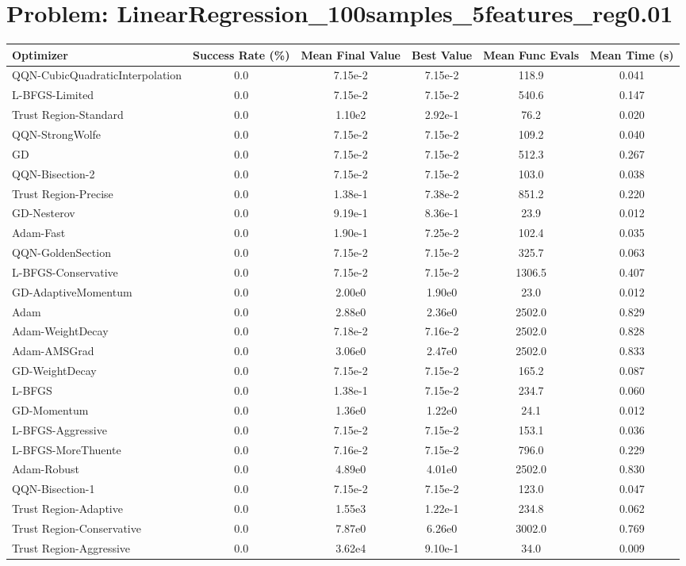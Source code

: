 \documentclass{article}
\begin{document}
\section{Problem: LinearRegression\_100samples\_5features\_reg0.01}
\begin{longtable}{p{3cm}*{5}{c}}
\toprule
\textbf{Optimizer} & \textbf{Success Rate (\%)} & \textbf{Mean Final Value} & \textbf{Best Value} & \textbf{Mean Func Evals} & \textbf{Mean Time (s)} \\
\midrule
QQN-CubicQuadraticInterpolation & 0.0 & 7.15e-2 & 7.15e-2 & 118.9 & 0.041 \\
L-BFGS-Limited & 0.0 & 7.15e-2 & 7.15e-2 & 540.6 & 0.147 \\
Trust Region-Standard & 0.0 & 1.10e2 & 2.92e-1 & 76.2 & 0.020 \\
QQN-StrongWolfe & 0.0 & 7.15e-2 & 7.15e-2 & 109.2 & 0.040 \\
GD & 0.0 & 7.15e-2 & 7.15e-2 & 512.3 & 0.267 \\
QQN-Bisection-2 & 0.0 & 7.15e-2 & 7.15e-2 & 103.0 & 0.038 \\
Trust Region-Precise & 0.0 & 1.38e-1 & 7.38e-2 & 851.2 & 0.220 \\
GD-Nesterov & 0.0 & 9.19e-1 & 8.36e-1 & 23.9 & 0.012 \\
Adam-Fast & 0.0 & 1.90e-1 & 7.25e-2 & 102.4 & 0.035 \\
QQN-GoldenSection & 0.0 & 7.15e-2 & 7.15e-2 & 325.7 & 0.063 \\
L-BFGS-Conservative & 0.0 & 7.15e-2 & 7.15e-2 & 1306.5 & 0.407 \\
GD-AdaptiveMomentum & 0.0 & 2.00e0 & 1.90e0 & 23.0 & 0.012 \\
Adam & 0.0 & 2.88e0 & 2.36e0 & 2502.0 & 0.829 \\
Adam-WeightDecay & 0.0 & 7.18e-2 & 7.16e-2 & 2502.0 & 0.828 \\
Adam-AMSGrad & 0.0 & 3.06e0 & 2.47e0 & 2502.0 & 0.833 \\
GD-WeightDecay & 0.0 & 7.15e-2 & 7.15e-2 & 165.2 & 0.087 \\
L-BFGS & 0.0 & 1.38e-1 & 7.15e-2 & 234.7 & 0.060 \\
GD-Momentum & 0.0 & 1.36e0 & 1.22e0 & 24.1 & 0.012 \\
L-BFGS-Aggressive & 0.0 & 7.15e-2 & 7.15e-2 & 153.1 & 0.036 \\
L-BFGS-MoreThuente & 0.0 & 7.16e-2 & 7.15e-2 & 796.0 & 0.229 \\
Adam-Robust & 0.0 & 4.89e0 & 4.01e0 & 2502.0 & 0.830 \\
QQN-Bisection-1 & 0.0 & 7.15e-2 & 7.15e-2 & 123.0 & 0.047 \\
Trust Region-Adaptive & 0.0 & 1.55e3 & 1.22e-1 & 234.8 & 0.062 \\
Trust Region-Conservative & 0.0 & 7.87e0 & 6.26e0 & 3002.0 & 0.769 \\
Trust Region-Aggressive & 0.0 & 3.62e4 & 9.10e-1 & 34.0 & 0.009 \\
\bottomrule
\end{longtable}
\end{document}
